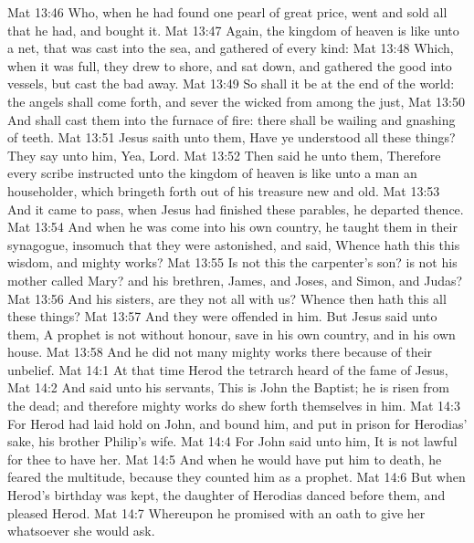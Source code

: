 \vs Mat 13:46 Who, when he had found one pearl of great price, went and sold all that he had, and bought it.
\vs Mat 13:47 Again, the kingdom of heaven is like unto a net, that was cast into the sea, and gathered of every kind:
\vs Mat 13:48 Which, when it was full, they drew to shore, and sat down, and gathered the good into vessels, but cast the bad away.
\vs Mat 13:49 So shall it be at the end of the world: the angels shall come forth, and sever the wicked from among the just,
\vs Mat 13:50 And shall cast them into the furnace of fire: there shall be wailing and gnashing of teeth.
\vs Mat 13:51 Jesus saith unto them, Have ye understood all these things? They say unto him, Yea, Lord.
\vs Mat 13:52 Then said he unto them, Therefore every scribe  instructed unto the kingdom of heaven is like unto a man  an householder, which bringeth forth out of his treasure  new and old.
\vs Mat 13:53 And it came to pass,  when Jesus had finished these parables, he departed thence.
\vs Mat 13:54 And when he was come into his own country, he taught them in their synagogue, insomuch that they were astonished, and said, Whence hath this  this wisdom, and  mighty works?
\vs Mat 13:55 Is not this the carpenter's son? is not his mother called Mary? and his brethren, James, and Joses, and Simon, and Judas?
\vs Mat 13:56 And his sisters, are they not all with us? Whence then hath this  all these things?
\vs Mat 13:57 And they were offended in him. But Jesus said unto them, A prophet is not without honour, save in his own country, and in his own house.
\vs Mat 13:58 And he did not many mighty works there because of their unbelief.
\vs Mat 14:1 At that time Herod the tetrarch heard of the fame of Jesus,
\vs Mat 14:2 And said unto his servants, This is John the Baptist; he is risen from the dead; and therefore mighty works do shew forth themselves in him.
\vs Mat 14:3 For Herod had laid hold on John, and bound him, and put  in prison for Herodias' sake, his brother Philip's wife.
\vs Mat 14:4 For John said unto him, It is not lawful for thee to have her.
\vs Mat 14:5 And when he would have put him to death, he feared the multitude, because they counted him as a prophet.
\vs Mat 14:6 But when Herod's birthday was kept, the daughter of Herodias danced before them, and pleased Herod.
\vs Mat 14:7 Whereupon he promised with an oath to give her whatsoever she would ask.
